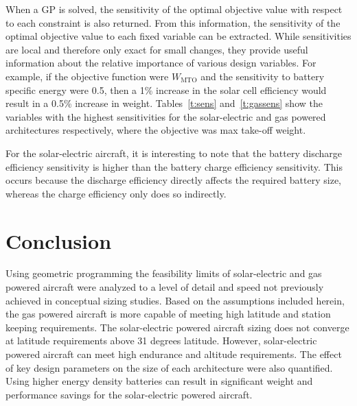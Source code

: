 When a GP is solved, the sensitivity of the optimal objective value with respect to each constraint is also returned.  
From this information, the sensitivity of the optimal objective value to each fixed variable can be extracted.\cite{hoburgthesis} 
While sensitivities are local and therefore only exact for small changes, they provide useful information about the relative importance of various design variables. 
For example, if the objective function were $W_{\text{MTO}}$ and the sensitivity to battery specific energy were 0.5, then a 1\% increase in the solar cell efficiency would result in a 0.5\% increase in weight.  
Tables~\ref{t:sens} and~\ref{t:gassens} show the variables with the highest sensitivities for the solar-electric and gas powered architectures respectively, where the objective was max take-off weight.

For the solar-electric aircraft, it is interesting to note that the battery discharge efficiency sensitivity is higher than the battery charge efficiency sensitivity.
This occurs because the discharge efficiency directly affects the required battery size, whereas the charge efficiency only does so indirectly. 






\section{Conclusion}

Using geometric programming the feasibility limits of solar-electric and gas powered aircraft were analyzed to a level of detail and speed not previously achieved in conceptual sizing studies. 
Based on the assumptions included herein, the gas powered aircraft is more capable of meeting high latitude and station keeping requirements. 
The solar-electric powered aircraft sizing does not converge at latitude requirements above 31 degrees latitude. 
However, solar-electric powered aircraft can meet high endurance and altitude requirements.  
The effect of key design parameters on the size of each architecture were also quantified.  
Using higher energy density batteries can result in significant weight and performance savings for the solar-electric powered aircraft.  

